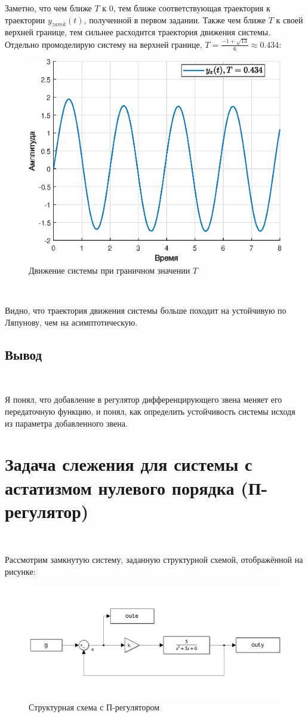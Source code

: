 \documentclass[a4paper]{article}
\begin{document}
Заметно, что чем ближе $T$ к 0, тем ближе соответствующая траектория к траектории $y_{zamk}(t)$, полученной в первом задании. Также чем ближе $T$ к своей верхней границе, тем сильнее расходится траектория движения системы. Отдельно промоделирую систему на верхней границе, $T = \frac{-1 + \sqrt{13}}{6}\approx 0.434$:

\begin{figure}[H]
    \centering
    \includegraphics[width=0.65\linewidth]{ex2/0.434.eps}
    \caption{Движение системы при граничном значении $T$}
\end{figure}\

Видно, что траектория движения системы больше походит на устойчивую по Ляпунову, чем на асимптотическую.

\subsection{Вывод}\

Я понял, что добавление в регулятор дифференцирующего звена меняет его передаточную функцию, и понял, как определить устойчивость системы исходя из параметра добавленного звена. 

\section{Задача слежения для системы с астатизмом нулевого порядка (П-регулятор)}\

Рассмотрим замкнутую систему, заданную структурной схемой, отображённой на рисунке:

\begin{figure}[H]
    \centering
    \includegraphics[width=0.65\linewidth]{ex3/image.png}
    \caption{Структурная схема с П-регулятором}
\end{figure}\
\end{document}

